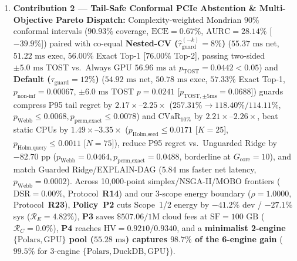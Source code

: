 \documentclass[10pt,a4paper]{article}
\begin{document}
\begin{enumerate}[leftmargin=1.5em,itemsep=1.5pt]
    \item \textbf{Contribution 2 --- Tail-Safe Conformal PCIe Abstention \& Multi-Objective Pareto Dispatch:} Complexity-weighted Mondrian $90\%$ conformal intervals ($90.93\%$ coverage, $\text{ECE}=0.67\%$, $\text{AURC}=28.14\%$ [$-39.9\%$]) paired with co-equal \textbf{Nested-CV ($\hat{\tau}_{\text{guard}}^{(-k)}=8\%$)} ($55.37\text{ ms}$ net, $51.22\text{ ms}$ exec, $56.00\%$ Exact Top-1 [$76.00\%$ Top-2], passing two-sided $\pm 5.0\text{ ms}$ TOST vs.\ Always GPU $56.96\text{ ms}$ at $p_{\text{TOST}}=0.0442 < 0.05$) and \textbf{Default ($\tau_{\text{guard}}=12\%$)} ($54.92\text{ ms}$ net, $50.78\text{ ms}$ exec, $57.33\%$ Exact Top-1, $p_{\text{non-inf}}=0.00067$, $\pm 6.0\text{ ms}$ TOST $p=0.0241$ [$p_{\text{TOST},\pm 5\text{ms}}=0.0688$]) guards compress P95 tail regret by $\mathbf{2.17\times\text{--}2.25\times}$ ($257.31\%\rightarrow 118.40\%/114.11\%$, $p_{\text{Webb}}\le 0.0068, p_{\text{perm,exact}}\le 0.0078$) and $\text{CVaR}_{10\%}$ by $2.21\times\text{--}2.26\times$, beat static CPUs by $1.49\times\text{--}3.35\times$ ($p_{\text{Holm,seed}}\le 0.0171$ [$K=25$], $p_{\text{Holm,query}}\le 0.0011$ [$N=75$]), reduce P95 regret vs.\ Unguarded Ridge by $-82.70\text{ pp}$ ($p_{\text{Webb}}=0.0464, p_{\text{perm,exact}}=0.0488$, borderline at $G_{\text{core}}=10$), and match Guarded Ridge/EXPLAIN-DAG ($5.84\text{ ms}$ faster net latency, $p_{\text{Webb}}=0.0002$). Across 10,000-point simplex/NSGA-II/MOBO frontiers ($\text{DSR}=0.00\%$, Protocol~\textbf{R14}) and our 3-scope energy boundary ($\rho=1.0000$, Protocol~\textbf{R23}), \textbf{Policy~P2} cuts Scope~1/2 energy by $-41.2\%$ dev / $-27.1\%$ sys ($\mathcal{R}_E=4.82\%$), \textbf{P3} saves $\$507.06/1\text{M}$ cloud fees at $\text{SF}=100\text{ GB}$ ($\mathcal{R}_C=0.0\%$), \textbf{P4} reaches $\text{HV}=0.9210 / 0.9340$, and a \textbf{minimalist 2-engine $\{\text{Polars}, \text{GPU}\}$ pool ($55.28\text{ ms}$) captures $98.7\%$ of the 6-engine gain} ($99.5\%$ for 3-engine $\{\text{Polars}, \text{DuckDB}, \text{GPU}\}$).

\end{enumerate}
\end{document}

